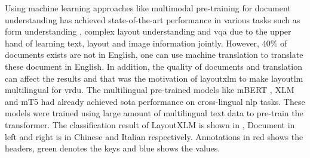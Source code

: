 Using machine learning approaches like multimodal pre-training for document understanding has achieved state-of-the-art performance in various tasks such as form understanding \cite{jaume2019funsd}, complex layout understanding \cite{gralinski2020kleister} and \acrfull{vqa} \cite{mathew2021docvqa} due to the upper hand of learning text, layout and image information jointly. However, 40\% of documents exists are not in English, one can use machine translation to translate these document in English. In addition, the quality of documents and translation can affect the results and that was the motivation of layoutxlm \cite{xu2021layoutxlm} to make layoutlm\cite{xu2020layoutlm} multilingual for \acrfull{vrdu}. The multilingual pre-trained models like mBERT \cite{devlin2018bert}, XLM \cite{lample2019cross} and mT5 \cite{xue2020mt5} had already achieved \acrshort{sota} performance on cross-lingual \acrshort{nlp} tasks. These models were trained using large amount of multilingual text data to pre-train the transformer. The classification result of LayoutXLM is shown in , Document in left and right is in Chinese and Italian respectively. Annotations in red shows the headers, green denotes the keys and blue shows the values. 

